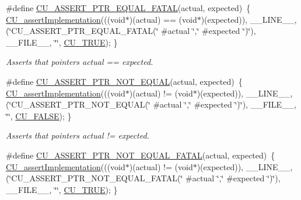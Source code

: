 \begin{DoxyCompactItemize}
\#define \hyperlink{group__Framework_ga6698c1d77f53a296cc34db3a9ceeb895}{C\-U\-\_\-\-A\-S\-S\-E\-R\-T\-\_\-\-P\-T\-R\-\_\-\-E\-Q\-U\-A\-L\-\_\-\-F\-A\-T\-A\-L}(actual, expected)~\{ \hyperlink{group__Framework_ga31a858e8b496b2af992b63902064c5fa}{C\-U\-\_\-assert\-Implementation}(((void$\ast$)(actual) == (void$\ast$)(expected)), \-\_\-\-\_\-\-L\-I\-N\-E\-\_\-\-\_\-, (\char`\"{}C\-U\-\_\-\-A\-S\-S\-E\-R\-T\-\_\-\-P\-T\-R\-\_\-\-E\-Q\-U\-A\-L\-\_\-\-F\-A\-T\-A\-L(\char`\"{} \#actual \char`\"{},\char`\"{} \#expected \char`\"{})\char`\"{}), \-\_\-\-\_\-\-F\-I\-L\-E\-\_\-\-\_\-, \char`\"{}\char`\"{}, \hyperlink{group__Framework_ga99641394bc766ca9c4a295e942fed1ef}{C\-U\-\_\-\-T\-R\-U\-E}); \}
\begin{DoxyCompactList}\small\item\em Asserts that pointers actual == expected. \end{DoxyCompactList}\item 
\#define \hyperlink{group__Framework_gab18ddeb24a2c2efbe890b27f6c538bd9}{C\-U\-\_\-\-A\-S\-S\-E\-R\-T\-\_\-\-P\-T\-R\-\_\-\-N\-O\-T\-\_\-\-E\-Q\-U\-A\-L}(actual, expected)~\{ \hyperlink{group__Framework_ga31a858e8b496b2af992b63902064c5fa}{C\-U\-\_\-assert\-Implementation}(((void$\ast$)(actual) != (void$\ast$)(expected)), \-\_\-\-\_\-\-L\-I\-N\-E\-\_\-\-\_\-, (\char`\"{}C\-U\-\_\-\-A\-S\-S\-E\-R\-T\-\_\-\-P\-T\-R\-\_\-\-N\-O\-T\-\_\-\-E\-Q\-U\-A\-L(\char`\"{} \#actual \char`\"{},\char`\"{} \#expected \char`\"{})\char`\"{}), \-\_\-\-\_\-\-F\-I\-L\-E\-\_\-\-\_\-, \char`\"{}\char`\"{}, \hyperlink{group__Framework_ga7453214541b156ef868681eaafe60860}{C\-U\-\_\-\-F\-A\-L\-S\-E}); \}
\begin{DoxyCompactList}\small\item\em Asserts that pointers actual != expected. \end{DoxyCompactList}\item 
\#define \hyperlink{group__Framework_gab171ca2c6f29568150372c0bf0657c00}{C\-U\-\_\-\-A\-S\-S\-E\-R\-T\-\_\-\-P\-T\-R\-\_\-\-N\-O\-T\-\_\-\-E\-Q\-U\-A\-L\-\_\-\-F\-A\-T\-A\-L}(actual, expected)~\{ \hyperlink{group__Framework_ga31a858e8b496b2af992b63902064c5fa}{C\-U\-\_\-assert\-Implementation}(((void$\ast$)(actual) != (void$\ast$)(expected)), \-\_\-\-\_\-\-L\-I\-N\-E\-\_\-\-\_\-, (\char`\"{}C\-U\-\_\-\-A\-S\-S\-E\-R\-T\-\_\-\-P\-T\-R\-\_\-\-N\-O\-T\-\_\-\-E\-Q\-U\-A\-L\-\_\-\-F\-A\-T\-A\-L(\char`\"{} \#actual \char`\"{},\char`\"{} \#expected \char`\"{})\char`\"{}), \-\_\-\-\_\-\-F\-I\-L\-E\-\_\-\-\_\-, \char`\"{}\char`\"{}, \hyperlink{group__Framework_ga99641394bc766ca9c4a295e942fed1ef}{C\-U\-\_\-\-T\-R\-U\-E}); \}

\end{DoxyCompactItemize}
